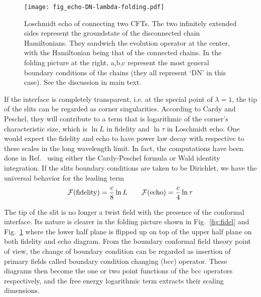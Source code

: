 \begin{figure}[h]
\centering
\texttt{[image: fig\_echo-DN-lambda-folding.pdf]}
\caption{Loschmidt echo of connecting two CFTs. The two infinitely extended sides represent the groundstate of the disconnected chain Hamiltonians. They sandwich the evolution operator at the center, with the Hamiltonian being that of the connected chains. In the folding picture at the right, a,b,c represent the most general boundary conditions of the chains (they all represent `DN' in this case). See the discussion in main text.}
\label{fig:echo}
\end{figure}

If the interface is completely transparent, i.e. at the special point of $\lambda = 1$, the tip of the slits can be regarded as corner singularities. According to Cardy and Peschel\cite{cardy_finite-size_1988}, they will contribute to a term that is logarithmic of the corner's characteristic size, which is $\ln L$ in fidelity and $\ln \tau$ in Loschmidt echo. One would expect the fidelity and echo to have power law decay with respective to these scales in the long wavelength limit. In fact, the computations have been done in Ref.~ using either the Cardy-Peschel formula or Wald identity integration. If the slits boundary conditions are taken to be Dirichlet, we have the universal behavior for the leading term \cite{stephan_logarithmic_2013,stephan_local_2011}
\begin{equation}
\label{eq:full-pass}
\mathcal{F}({\rm fidelity}) =  \frac{c}{8} \ln L \qquad \mathcal{F}( {\rm echo} )  = \frac{c}{4} \ln \tau 
\end{equation}

The tip of the slit is no longer a twist field with the presence of the conformal interface. Its nature is clearer in the folding picture shown in Fig.~\ref{fig:fidel} and Fig.~\ref{fig:echo} where the lower half plane is flipped up on top of the upper half plane on both fidelity and echo diagram. From the boundary conformal field theory point of view, the change of boundary condition can be regarded as insertion of primary fields called boundary condition changing (bcc) operator. These diagrams then become the one or two point functions of the bcc operators respectively, and the free energy logarithmic term extracts their scaling dimensions. 





